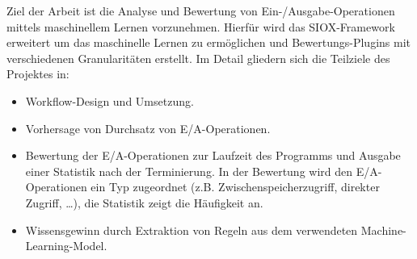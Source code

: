 



Ziel der Arbeit ist die Analyse und Bewertung von Ein-/Ausgabe-Operationen mittels maschinellem Lernen vorzunehmen.
Hierfür wird das SIOX-Framework erweitert um das maschinelle Lernen zu ermöglichen und Bewertungs-Plugins mit verschiedenen Granularitäten erstellt.
Im Detail gliedern sich die Teilziele des Projektes in:

\begin{itemize}
	\item Workflow-Design und Umsetzung.
	\item Vorhersage von Durchsatz von E/A-Operationen.
	\item Bewertung der E/A-Operationen zur Laufzeit des Programms und Ausgabe einer Statistik nach der Terminierung. 
		In der Bewertung wird den E/A-Operationen ein Typ zugeordnet (z.B.  Zwischenspeicherzugriff, direkter Zugriff, \dots), die Statistik zeigt die Häufigkeit an.
	\item Wissensgewinn durch Extraktion von Regeln aus dem verwendeten Machine-Learning-Model.
\end{itemize}


